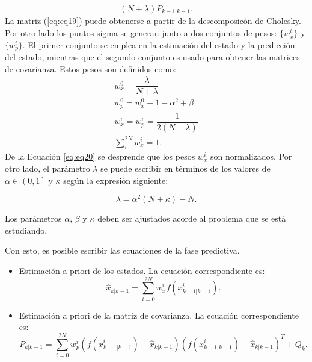 \begin{enumerate}
 \begin{equation}
 (N+\lambda) P_{k-1 | k-1}.
 \label{eq:eq19}
 \end{equation}
La matriz (\ref{eq:eq19}) puede obtenerse a partir de la descomposic\'on de Cholesky. Por otro lado los puntos sigma se generan junto a dos conjuntos de pesos: $\lbrace w_x^{i} \rbrace$ y $\lbrace w_p^{i} \rbrace$. El primer conjunto se emplea en la estimaci\'on del estado y la predicci\'on del estado, mientras que el segundo conjunto es usado para obtener las matrices de covarianza. Estos pesos son definidos como:
\begin{equation}
\label{eq:eq20}
\begin{gathered}
w^0_x = \dfrac{\lambda}{N+\lambda}\\
w^0_p = w^0_x + 1 - \alpha^2 + \beta\\
w^i_x = w^i_p = \dfrac{1}{2(N+\lambda)}\\
\sum_i^{2N} w^i_x = 1.
\end{gathered}
\end{equation}
De la Ecuaci\'on \ref{eq:eq20} se desprende que los pesos $w_x^i$ son normalizados. Por otro lado, el par\'ametro $\lambda$ se puede escribir en t\'erminos de los valores de $\alpha \in \left( 0,1\right]$ y $\kappa$ seg\'un la expresi\'on siguiente:%

\begin{equation}
\label{eq:eq21}
\lambda = \alpha^2  (N + \kappa)- N.
\end{equation}

Los par\'ametros $\alpha$, $\beta$ y $\kappa$ deben ser ajustados acorde al problema que se est\'a estudiando.
\bigskip

Con esto, es posible escribir las ecuaciones de la fase predictiva.
\begin{itemize}
\item Estimaci\'on a priori de los estados. La ecuaci\'on correspondiente es:\\
\begin{equation}
\label{eq:eq22}
\hat{x}_{k|k-1} = \sum_{i=0}^{2N} w_{x}^i f(\bar{x}^i_{k-1|k-1}).
\end{equation}

\item Estimaci\'on a priori de la matriz de covarianza. La ecuaci\'on correspondiente es:\\

\begin{equation}
\label{eq:eq23}
P_{k|k-1} = \sum_{i=0}^{2N} w_p^i \left( f(\bar{x}^i_{k-1|k-1})  - \hat{x}_{k|k-1}\right)\left( f(\bar{x}^i_{k-1|k-1}) - \hat{x}_{k|k-1}  \right)^T + Q_k.
\end{equation}
\end{itemize}



\end{enumerate}
